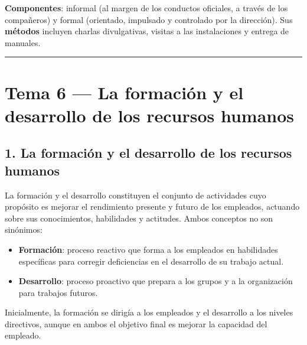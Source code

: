 \documentclass[12pt]{book} %
\providecommand{\tightlist}{%
  \setlength{\itemsep}{0pt}\setlength{\parskip}{0pt}}
\begin{document}
\textbf{Componentes}: informal (al margen de los conductos oficiales, a
través de los compañeros) y formal (orientado, impulsado y controlado
por la dirección). Sus \textbf{métodos} incluyen charlas divulgativas,
visitas a las instalaciones y entrega de manuales.

\begin{center}\rule{0.5\linewidth}{0.5pt}\end{center}

\hypertarget{tema-6-la-formaciuxf3n-y-el-desarrollo-de-los-recursos-humanos}{%
\chapter{Tema 6 --- La formación y el desarrollo de los recursos
humanos}\label{tema-6-la-formaciuxf3n-y-el-desarrollo-de-los-recursos-humanos}}

\hypertarget{la-formaciuxf3n-y-el-desarrollo-de-los-recursos-humanos}{%
\section{1. La formación y el desarrollo de los recursos
humanos}\label{la-formaciuxf3n-y-el-desarrollo-de-los-recursos-humanos}}

La formación y el desarrollo constituyen el conjunto de actividades cuyo
propósito es mejorar el rendimiento presente y futuro de los empleados,
actuando sobre sus conocimientos, habilidades y actitudes. Ambos
conceptos no son sinónimos:

\begin{itemize}
\tightlist
\item
  \textbf{Formación}: proceso reactivo que forma a los empleados en
  habilidades específicas para corregir deficiencias en el desarrollo de
  su trabajo actual.
\item
  \textbf{Desarrollo}: proceso proactivo que prepara a los grupos y a la
  organización para trabajos futuros.
\end{itemize}

Inicialmente, la formación se dirigía a los empleados y el desarrollo a
los niveles directivos, aunque en ambos el objetivo final es mejorar la
capacidad del empleado.
\end{document}
